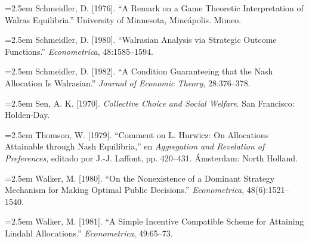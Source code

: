 \documentclass[12pt, letterpaper]{article}
\newcommand{\bibentry}[1]{\noindent\hangindent=2.5em\hangafter=1 \small #1 \par\vspace{0.75em}}
\begin{document}
\bibentry{Schmeidler, D. [1976]. ``A Remark on a Game Theoretic Interpretation of Walras Equilibria.'' University of Minnesota, Mineápolis. Mimeo.}
\bibentry{Schmeidler, D. [1980]. ``Walrasian Analysis via Strategic Outcome Functions.'' \textit{Econometrica}, 48:1585--1594.}
\bibentry{Schmeidler, D. [1982]. ``A Condition Guaranteeing that the Nash Allocation Is Walrasian.'' \textit{Journal of Economic Theory}, 28:376--378.}
\bibentry{Sen, A. K. [1970]. \textit{Collective Choice and Social Welfare}. San Francisco: Holden-Day.}
\bibentry{Thomson, W. [1979]. ``Comment on L. Hurwicz: On Allocations Attainable through Nash Equilibria,'' en \textit{Aggregation and Revelation of Preferences}, editado por J.-J. Laffont, pp. 420--431. Ámsterdam: North Holland.}
\bibentry{Walker, M. [1980]. ``On the Nonexistence of a Dominant Strategy Mechanism for Making Optimal Public Decisions.'' \textit{Econometrica}, 48(6):1521--1540.}
\bibentry{Walker, M. [1981]. ``A Simple Incentive Compatible Scheme for Attaining Lindahl Allocations.'' \textit{Econometrica}, 49:65--73.}
\end{document}
